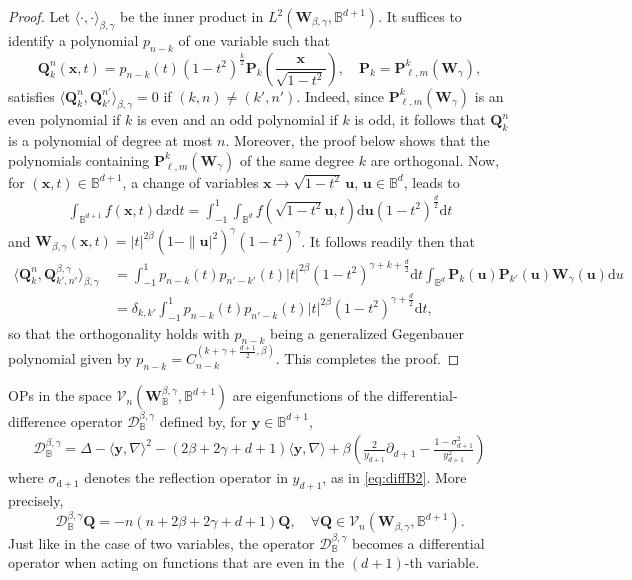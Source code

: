 \documentclass{amsart}
\theoremstyle{remark}
\def\la{{\langle}}
\def\ra{{\rangle}}
\def\d{\mathrm{d}}
\def\b{{\beta}}
\def\g{{\gamma}}
\def\s{\sigma}
\def\la{{\langle}}
\def\ra{{\rangle}}
\def\ub{{\mathbf u}}
\def\xb{{\mathbf x}}
\def\yb{{\mathbf y}}
\def\Pb{{\mathbf P}}
\def\Qb{{\mathbf Q}}
\def\Wb{{\mathbf W}}
\def\CD{{\mathcal D}}
\def\CV{{\mathcal V}}
\def\BB{{\mathbb B}}
\def\f{\frac}
\begin{document}
\begin{proof}
Let $\la \cdot,\cdot\ra_{\b,\g}$ be the inner product in $L^2(\Wb_{\b,\g}, \BB^{d+1})$. It suffices to identify 
a polynomial $p_{n-k}$ of one variable such that 
$$
\Qb_k^n(\xb,t) = p_{n-k}(t) (1-t^2)^\frac{k}{2} \Pb_k \left(\frac{\xb}{\sqrt{1-t^2}}\right), \quad \Pb_k = \Pb_{\ell, m}^k(\Wb_\g), 
$$
satisfies $\la \Qb_k^n, \Qb_{k'}^{n'} \ra_{\b,\g} = 0$ if $(k,n) \ne (k',n')$. Indeed, since $\Pb_{\ell, m}^k(\Wb_\g)$
is an even polynomial if $k$ is even and an odd polynomial if $k$ is odd, it follows that $\Qb_k^n$ is a
polynomial of degree at most $n$. Moreover, the proof below shows that the polynomials containing 
$\Pb_{\ell,m}^k(\Wb_\g)$ of the same degree $k$ are orthogonal. Now, for $(\xb,t) \in \BB^{d+1}$, a change of 
variables $\xb \to \sqrt{1-t^2}\, \ub$, $\ub \in \BB^d$, leads to
\begin{align*}
\int_{\BB^{d+1}}  f(\xb,t)  \d x \d t =  \int_{-1}^1  \int_{\BB^d} f\left(\sqrt{1-t^2} \ub, t\right)  \d \ub  (1-t^2)^{\f d 2} \d t
\end{align*}
and $\Wb_{\b,\g}(\xb,t) =|t|^{2\b} (1-\|\ub|^2)^\g  (1-t^2)^\g$. It follows readily then that 
\begin{align*}
 \la \Qb_k^n, \Qb_{k',n'}^{\b,\g}\ra_{\b,\g} \,& = 
   \int_{-1}^1 p_{n-k}(t) p_{n'-k'}(t) |t|^{2\b} (1-t^2)^{\g+k+\f{d}{2}} \d t \int_{\BB^d} \Pb_k(\ub) \Pb_{k'} (\ub)
     \Wb_{\g} (\ub) \d u \\
  & =  \delta_{k, k'} \int_{-1}^1 p_{n-k}(t) p_{n'-k}(t) |t|^{2\b} (1-t^2)^{\g+\f{d}{2}} \d t,  
\end{align*}
so that the orthogonality holds with $p_{n-k}$ being a generalized Gegenbauer polynomial given by 
$p_{n-k} = C_{n-k}^{(k+\g+\frac{d+1}{2}, \b)}$. This completes the proof.
\end{proof}
  
 OPs in the space $\CV_n(\Wb_\BB^{\b,\g}, \BB^{d+1})$ are eigenfunctions of the differential-difference operator
 $\CD_\BB^{\b,\g}$ defined by, for $\yb \in \BB^{d+1}$, \cite[Theorem 8.1.3 and (7.5.3)]{DX}
\begin{align}\label{eq:D_BBd+1}
  \CD_\BB^{\b,\g} =  \Delta - \la \yb ,\nabla \ra^2 - (2\b + 2\g + d+1) \la \yb, \nabla\ra 
     + \b \left(\frac{2}{y_{d+1}} \partial_{d+1} - \frac{1-\s_{d+1}^2}{y_{d+1}^2} \right) 
\end{align}
where $\s_{\d+1}$ denotes the reflection operator in $y_{d+1}$, as in \eqref{eq:diffB2}. More precisely, 
$$
  \CD_\BB^{\b,\g} \Qb =  - n(n + 2\b + 2\g +d+1) \Qb, \quad \forall \Qb \in  \CV_n(\Wb_{\b,\g},\BB^{d+1}).
$$
Just like in the case of two variables, the operator $\CD_\BB^{\b,\g}$ becomes a differential operator when acting on
functions that are even in the $(d+1)$-th variable. 
\end{document}

